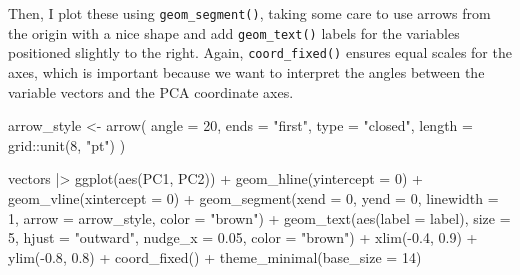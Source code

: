 \documentclass[
  letterpaper,
  10pt,
  krantz2]{krantz}
\makeatletter
\newenvironment{Shaded}{\begin{snugshade}}{\end{snugshade}}
\newcommand{\AttributeTok}[1]{\textcolor[rgb]{0.40,0.45,0.13}{#1}}
\newcommand{\DecValTok}[1]{\textcolor[rgb]{0.68,0.00,0.00}{#1}}
\newcommand{\FloatTok}[1]{\textcolor[rgb]{0.68,0.00,0.00}{#1}}
\newcommand{\FunctionTok}[1]{\textcolor[rgb]{0.28,0.35,0.67}{#1}}
\newcommand{\NormalTok}[1]{\textcolor[rgb]{0.00,0.23,0.31}{#1}}
\newcommand{\OtherTok}[1]{\textcolor[rgb]{0.00,0.23,0.31}{#1}}
\newcommand{\SpecialCharTok}[1]{\textcolor[rgb]{0.37,0.37,0.37}{#1}}
\newcommand{\StringTok}[1]{\textcolor[rgb]{0.13,0.47,0.30}{#1}}
\newenvironment{kframe}{%
  \medskip{}
  \setlength{\fboxsep}{.8em}
  \def\at@end@of@kframe{}%
  \ifinner\ifhmode%
  \def\at@end@of@kframe{\end{minipage}}%
  \begin{minipage}{\columnwidth}%
  \fi\fi%
  \def\FrameCommand##1{\hskip\@totalleftmargin \hskip-\fboxsep
  \colorbox{shadecolor}{##1}\hskip-\fboxsep
      \hskip-\linewidth \hskip-\@totalleftmargin \hskip\columnwidth}%
  \MakeFramed {\advance\hsize-\width
    \@totalleftmargin\z@ \linewidth\hsize
    \@setminipage}}%
{\par\unskip\endMakeFramed%
  \at@end@of@kframe}
\renewenvironment{Shaded}{\begin{kframe}}{\end{kframe}}
\makeatother
\begin{document}
Then, I plot these using \texttt{geom\_segment()}, taking some care to
use arrows from the origin with a nice shape and add
\texttt{geom\_text()} labels for the variables positioned slightly to
the right. Again, \texttt{coord\_fixed()} ensures equal scales for the
axes, which is important because we want to interpret the angles between
the variable vectors and the PCA coordinate axes.

\begin{Shaded}
\begin{Highlighting}[]
\NormalTok{arrow\_style }\OtherTok{\textless{}{-}} \FunctionTok{arrow}\NormalTok{(}
  \AttributeTok{angle =} \DecValTok{20}\NormalTok{, }\AttributeTok{ends =} \StringTok{"first"}\NormalTok{, }\AttributeTok{type =} \StringTok{"closed"}\NormalTok{, }
  \AttributeTok{length =}\NormalTok{ grid}\SpecialCharTok{::}\FunctionTok{unit}\NormalTok{(}\DecValTok{8}\NormalTok{, }\StringTok{"pt"}\NormalTok{)}
\NormalTok{)}

\NormalTok{vectors }\SpecialCharTok{|\textgreater{}}
  \FunctionTok{ggplot}\NormalTok{(}\FunctionTok{aes}\NormalTok{(PC1, PC2)) }\SpecialCharTok{+}
  \FunctionTok{geom\_hline}\NormalTok{(}\AttributeTok{yintercept =} \DecValTok{0}\NormalTok{) }\SpecialCharTok{+}
  \FunctionTok{geom\_vline}\NormalTok{(}\AttributeTok{xintercept =} \DecValTok{0}\NormalTok{) }\SpecialCharTok{+}
  \FunctionTok{geom\_segment}\NormalTok{(}\AttributeTok{xend =} \DecValTok{0}\NormalTok{, }\AttributeTok{yend =} \DecValTok{0}\NormalTok{, }
               \AttributeTok{linewidth =} \DecValTok{1}\NormalTok{, }
               \AttributeTok{arrow =}\NormalTok{ arrow\_style,}
               \AttributeTok{color =} \StringTok{"brown"}\NormalTok{) }\SpecialCharTok{+}
  \FunctionTok{geom\_text}\NormalTok{(}\FunctionTok{aes}\NormalTok{(}\AttributeTok{label =}\NormalTok{ label), }
            \AttributeTok{size =} \DecValTok{5}\NormalTok{,}
            \AttributeTok{hjust =} \StringTok{"outward"}\NormalTok{,}
            \AttributeTok{nudge\_x =} \FloatTok{0.05}\NormalTok{, }
            \AttributeTok{color =} \StringTok{"brown"}\NormalTok{) }\SpecialCharTok{+}
  \FunctionTok{xlim}\NormalTok{(}\SpecialCharTok{{-}}\FloatTok{0.4}\NormalTok{, }\FloatTok{0.9}\NormalTok{) }\SpecialCharTok{+} 
  \FunctionTok{ylim}\NormalTok{(}\SpecialCharTok{{-}}\FloatTok{0.8}\NormalTok{, }\FloatTok{0.8}\NormalTok{) }\SpecialCharTok{+}
  \FunctionTok{coord\_fixed}\NormalTok{() }\SpecialCharTok{+} 
  \FunctionTok{theme\_minimal}\NormalTok{(}\AttributeTok{base\_size =} \DecValTok{14}\NormalTok{)}
\end{Highlighting}
\end{Shaded}
\end{document}
